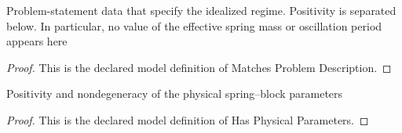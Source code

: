 \begin{definition}
  \label{def:physics:phyx-mini-0237:phyxminiproblems-problemphyxmini0237-matchesproblemdescription}
  Problem-statement data that specify the idealized regime. Positivity is separated below. In particular, no value of the effective spring mass or oscillation period appears here
\end{definition}
\begin{proof}
  This is the declared model definition of Matches Problem Description.
\end{proof}
\begin{definition}
  \label{def:physics:phyx-mini-0237:phyxminiproblems-problemphyxmini0237-hasphysicalparameters}
  Positivity and nondegeneracy of the physical spring--block parameters
\end{definition}
\begin{proof}
  This is the declared model definition of Has Physical Parameters.
\end{proof}
